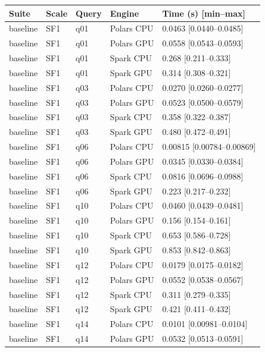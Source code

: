 \begin{longtable}{lllll}
\toprule
Suite & Scale & Query & Engine & Time (s) [min--max] \\
\midrule
\endhead
\bottomrule
\endfoot
baseline & SF1 & q01 & Polars CPU & 0.0463 [0.0440--0.0485] \\
baseline & SF1 & q01 & Polars GPU & 0.0558 [0.0543--0.0593] \\
baseline & SF1 & q01 & Spark CPU & 0.268 [0.211--0.333] \\
baseline & SF1 & q01 & Spark GPU & 0.314 [0.308--0.321] \\
baseline & SF1 & q03 & Polars CPU & 0.0270 [0.0260--0.0277] \\
baseline & SF1 & q03 & Polars GPU & 0.0523 [0.0500--0.0579] \\
baseline & SF1 & q03 & Spark CPU & 0.358 [0.322--0.387] \\
baseline & SF1 & q03 & Spark GPU & 0.480 [0.472--0.491] \\
baseline & SF1 & q06 & Polars CPU & 0.00815 [0.00784--0.00869] \\
baseline & SF1 & q06 & Polars GPU & 0.0345 [0.0330--0.0384] \\
baseline & SF1 & q06 & Spark CPU & 0.0816 [0.0696--0.0988] \\
baseline & SF1 & q06 & Spark GPU & 0.223 [0.217--0.232] \\
baseline & SF1 & q10 & Polars CPU & 0.0460 [0.0439--0.0481] \\
baseline & SF1 & q10 & Polars GPU & 0.156 [0.154--0.161] \\
baseline & SF1 & q10 & Spark CPU & 0.653 [0.586--0.728] \\
baseline & SF1 & q10 & Spark GPU & 0.853 [0.842--0.863] \\
baseline & SF1 & q12 & Polars CPU & 0.0179 [0.0175--0.0182] \\
baseline & SF1 & q12 & Polars GPU & 0.0552 [0.0538--0.0567] \\
baseline & SF1 & q12 & Spark CPU & 0.311 [0.279--0.335] \\
baseline & SF1 & q12 & Spark GPU & 0.421 [0.411--0.432] \\
baseline & SF1 & q14 & Polars CPU & 0.0101 [0.00981--0.0104] \\
baseline & SF1 & q14 & Polars GPU & 0.0532 [0.0513--0.0591] \\

\end{longtable}
